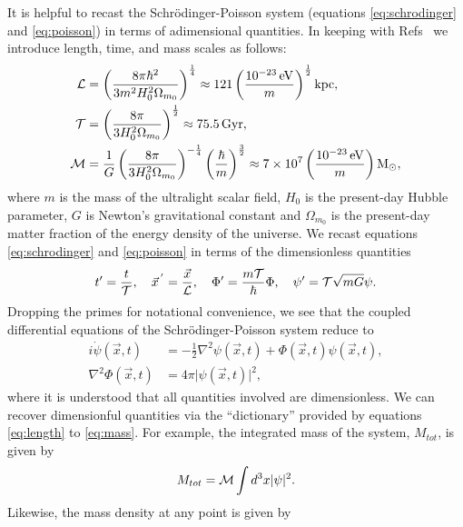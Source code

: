 \documentclass[a4paper,11pt]{article}
\begin{document}
It is helpful to recast the Schr{\"o}dinger-Poisson system (equations \ref{eq:schrodinger} and \ref{eq:poisson}) in terms of adimensional quantities. In keeping with Refs~\cite{Schive2014,Paredes2016} we introduce length, time, and mass scales as follows:
\begin{align}
    \CMcal{L}&=\left(\frac{8\pi\hbar^2}{3 m^2H_0^2\Omega_{m_0}}\right)^{\frac{1}{4}}\approx121\left(\frac{10^{-23}\operatorname{eV}}{m}\right)^{\frac{1}{2}}\operatorname{kpc},\label{eq:length}\\
    \CMcal{T}&=\left(\frac{8\pi}{3 H_0^2\Omega_{m_0}}\right)^{\frac{1}{2}}\approx75.5 \operatorname{Gyr},\label{eq:time}\\
    \CMcal{M}&=\frac{1}{G}\left(\frac{8\pi}{3 H_0^2\Omega_{m_0}}\right)^{-\frac{1}{4}}\left(\frac{\hbar}{m}\right)^{\frac{3}{2}}\approx 7\times 10^7\left(\frac{10^{-23}\operatorname{eV}}{m}\right)\operatorname{M}_{\odot},\label{eq:mass}
\end{align}
where $m$ is the mass of the ultralight scalar field, $H_0$ is the present-day Hubble parameter, $G$ is Newton's gravitational constant and $\Omega_{m_0}$ is the present-day matter fraction of the energy density of the universe. We  recast equations \ref{eq:schrodinger} and \ref{eq:poisson} in terms of the  dimensionless quantities
\begin{equation}\label{eq:dimensionless}
    t'=\frac{t}{\CMcal{T}},\quad
    \vec{x}^{\,'}=\frac{\vec{x}}{\CMcal{L}},\quad
    \Phi'=\frac{m\CMcal{T}}{\hbar}\Phi,\quad
    \psi'=\CMcal{T}\sqrt{mG}\psi.
\end{equation}
Dropping the primes for notational convenience, we see that the coupled differential equations of the  Schr{\"o}dinger-Poisson system  reduce to 
\begin{align}
    i\Dot{\psi}(\vec{x},t)&=-\frac{1}{2}\nabla^2\psi(\vec{x},t)+\Phi(\vec{x},t)\psi(\vec{x},t),\label{eq:s-adim}\\
    \nabla^2\Phi(\vec{x},t)&=4\pi\vert\psi(\vec{x},t)\vert^2,\label{eq:p-adim}
\end{align}
where it is understood that all quantities involved are dimensionless. We can recover  dimensionful quantities via the ``dictionary'' provided by equations \ref{eq:length} to \ref{eq:mass}. For example, the integrated mass of the system, $M_{tot}$, is given by
\begin{equation}\label{eq:integrated-mass}
    M_{tot}=\CMcal{M}\int d^3x\vert\psi\vert^2.
\end{equation}
Likewise, the mass density at any point is given by
\end{document}
